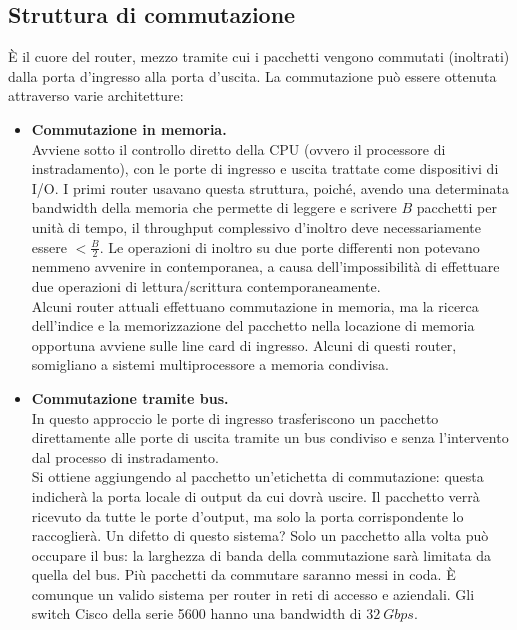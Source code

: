\newpage

\subsection{Struttura di commutazione}
È il cuore del router, mezzo tramite cui i pacchetti vengono commutati (inoltrati) dalla porta d'ingresso alla porta d'uscita. La commutazione può essere ottenuta attraverso varie architetture:
\begin{itemize}
	\item \textbf{Commutazione in memoria.}\\
	Avviene sotto il controllo diretto della CPU (ovvero il processore di instradamento), con le porte di ingresso e uscita trattate come dispositivi di I/O. I primi router usavano questa struttura, poiché, avendo una determinata bandwidth della memoria che permette di leggere e scrivere $B$ pacchetti per unità di tempo, il throughput complessivo d'inoltro deve necessariamente essere $< \frac{B}{2}$. Le operazioni di inoltro su due porte differenti non potevano nemmeno avvenire in contemporanea, a causa dell'impossibilità di effettuare due operazioni di lettura/scrittura contemporaneamente.\\
	Alcuni router attuali effettuano commutazione in memoria, ma la ricerca dell'indice e la memorizzazione del pacchetto nella locazione di memoria opportuna avviene sulle line card di ingresso. Alcuni di questi router, somigliano a sistemi multiprocessore a memoria condivisa.
	
	\item \textbf{Commutazione tramite bus.}\\
	In questo approccio le porte di ingresso trasferiscono un pacchetto direttamente alle porte di uscita tramite un bus condiviso e senza l'intervento dal processo di instradamento.\\
	Si ottiene aggiungendo al pacchetto un'etichetta di commutazione: questa indicherà la porta locale di output da cui dovrà uscire. Il pacchetto verrà ricevuto da tutte le porte d'output, ma solo la porta corrispondente lo raccoglierà. Un difetto di questo sistema? Solo un pacchetto alla volta può occupare il bus: la larghezza di banda della commutazione sarà limitata da quella del bus. Più pacchetti da commutare saranno messi in coda. È comunque un valido sistema per router in reti di accesso e aziendali. Gli switch Cisco della serie 5600 hanno una bandwidth di $32 \ Gbps$.
	

\end{itemize}
